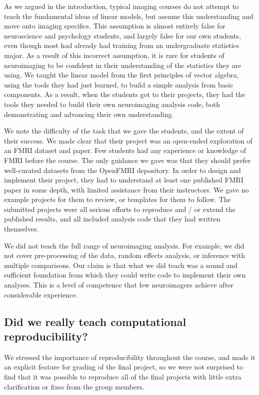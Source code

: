 As we argued in the introduction, typical imaging courses do not attempt to
teach the fundamental ideas of linear models, but assume this understanding
and move onto imaging specifics.  This assumption is almost entirely false for
neuroscience and psychology students, and largely false for our own
students, even though most had already had training from an undergraduate
statistics major. As a result of this incorrect assumption, it is rare for
students of neuroimaging to be confident in their understanding of the
statistics they are using.  We taught the linear model from the first
principles of vector algebra, using the tools they had just learned, to build
a simple analysis from basic components.  As a result, when the students got
to their projects, they had the tools they needed to build their own
neuroimaging analysis code, both demonstrating and advancing their own
understanding.

We note the difficulty of the task that we gave the students, and the
extent of their success.  We made clear that their project was an open-ended
exploration of an FMRI dataset and paper.  Few students had any
experience or knowledge of FMRI before the course. The only guidance we gave
was that they should prefer well-curated datasets from the OpenFMRI
depository.  In order to design and implement their project, they had to
understand at least one published FMRI paper in some depth, with limited
assistance from their instructors.  We gave no example projects for them to
review, or templates for them to follow.  The submitted projects were all serious efforts to reproduce and
/ or extend the published results, and all included analysis code that they
had written themselves.

We did not teach the full range of neuroimaging analysis.  For example, we did
not cover pre-processing of the data, random effects analysis, or inference
with multiple comparisons.   Our claim is that what we did teach was a sound
and sufficient foundation from which they could write code to implement their
own analyses.  This is a level of competence that few neuroimagers achieve
after considerable experience.

\subsection{Did we really teach computational reproducibility?}

We stressed the importance of reproducibility throughout the course, and
made it an explicit feature for grading of the final project, so we were not
surprised to find that it was possible to reproduce all of the final projects
with little extra clarification or fixes from the group members.

